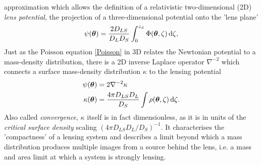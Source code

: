approximation which allows the definition of a relativistic two-dimensional (2D)
\textit{lens potential}, the projection of a three-dimensional potential onto
the 'lens plane'
%
%
\begin{equation}\eqlbl{lens_potential}%
  \psi(\bm\theta) = \frac{2D_{LS}}{D_{L}D_{S}}\int_{0}^{z_{S}}\Phi(\bm\theta, \zeta)\,\mathrm{d}\zeta,
\end{equation}%
%
Just as the Poisson equation \eqref*{Poisson} in 3D relates the Newtonian
potential to a mass-density distribution, there is a 2D inverse Laplace
operator $\nabla^{-2}$
which connects a surface mass-density distribution $\kappa$ to the lensing
potential
%
%
\begin{equation}\eqlbl{convergence}%
  \begin{aligned}
    \psi(\bm\theta) &= 2\nabla^{-2}\kappa \\
    \kappa(\bm\theta) &= \frac{4\pi D_{LS}D_{L}}{D_{S}}
    \int \rho(\bm\theta, \zeta)\,\mathrm{d}\zeta.
  \end{aligned}
\end{equation}%
%
Also called \textit{convergence}, $\kappa$ itself is in fact dimensionless, as
it is in units of the \textit{critical surface density} scaling $\left(4\pi
D_{LS}D_{L}/D_{S}\right)^{-1}$.  It characterises the 'compactness' of a lensing
system and describes a limit beyond which a mass distribution produces multiple
images from a source behind the lens, i.e. a mass and area limit at which a
system is strongly lensing.


